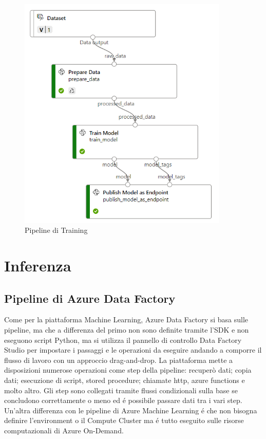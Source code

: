 \begin{figure}[t]
	\centering
	\includegraphics[width=10cm, scale=1]{images/pipeline}
	\caption{Pipeline di Training}
	\label{pipeline-training}
\end{figure}

\section{Inferenza}
\subsection{Pipeline di Azure Data Factory}
Come per la piattaforma Machine Learning, Azure Data Factory si basa sulle pipeline, ma che a differenza del primo non sono definite tramite l'SDK e non eseguono script Python, ma si utilizza il pannello di controllo Data Factory Studio per impostare i passaggi e le operazioni da eseguire andando a comporre il flusso di lavoro con un approccio drag-and-drop.
La piattaforma mette a disposizioni numerose operazioni come step della pipeline: recuperò dati; copia dati; esecuzione di script, stored procedure; chiamate http, azure functions e molto altro. 
Gli step sono collegati tramite flussi condizionali sulla base se concludono correttamente o meno ed é possibile passare dati tra i vari step.
Un'altra differenza con le pipeline di Azure Machine Learning é che non bisogna definire l'environment o il Compute Cluster ma é tutto eseguito sulle risorse computazionali di Azure On-Demand.
